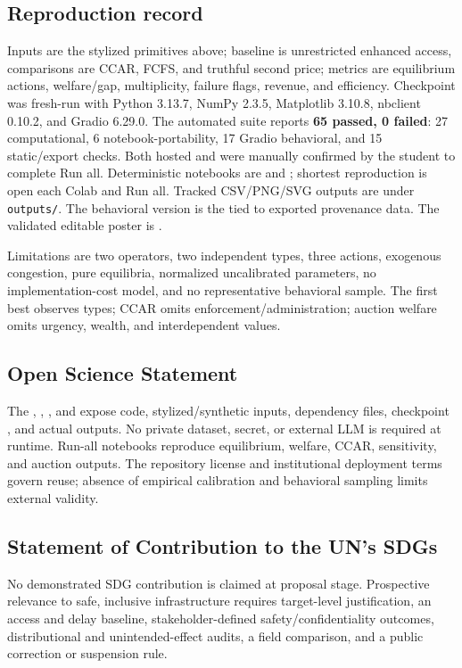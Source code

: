 \subsection{Reproduction record}
Inputs are the stylized primitives above; baseline is unrestricted enhanced access, comparisons are CCAR, FCFS, and truthful second price; metrics are equilibrium actions, welfare/gap, multiplicity, failure flags, revenue, and efficiency. Checkpoint \CurrentCommit{} was fresh-run with Python 3.13.7, NumPy 2.3.5, Matplotlib 3.10.8, nbclient 0.10.2, and Gradio 6.29.0. The automated suite reports \textbf{65 passed, 0 failed}: 27 computational, 6 notebook-portability, 17 Gradio behavioral, and 15 static/export checks. Both hosted \ColabOne{} and \ColabTwo{} were manually confirmed by the student to complete Run all. Deterministic notebooks are  and ; shortest reproduction is open each Colab and Run all. Tracked CSV/PNG/SVG outputs are under \texttt{outputs/}. The behavioral version is the \SpaceRepo{} tied to exported provenance data. The validated editable poster is \texttt{}.

Limitations are two operators, two independent types, three actions, exogenous congestion, pure equilibria, normalized uncalibrated parameters, no implementation-cost model, and no representative behavioral sample. The first best observes types; CCAR omits enforcement/administration; auction welfare omits urgency, wealth, and interdependent values.

\subsection*{Open Science Statement}
The \PublicRepo{}, \ColabOne{}, \ColabTwo{}, and \SpaceRepo{} expose code, stylized/synthetic inputs, dependency files, checkpoint \CurrentCommit{}, and actual outputs. No private dataset, secret, or external LLM is required at runtime. Run-all notebooks reproduce equilibrium, welfare, CCAR, sensitivity, and auction outputs. The repository license and institutional deployment terms govern reuse; absence of empirical calibration and behavioral sampling limits external validity.

\subsection*{Statement of Contribution to the UN's SDGs}
No demonstrated SDG contribution is claimed at proposal stage. Prospective relevance to safe, inclusive infrastructure requires target-level justification, an access and delay baseline, stakeholder-defined safety/confidentiality outcomes, distributional and unintended-effect audits, a field comparison, and a public correction or suspension rule.

